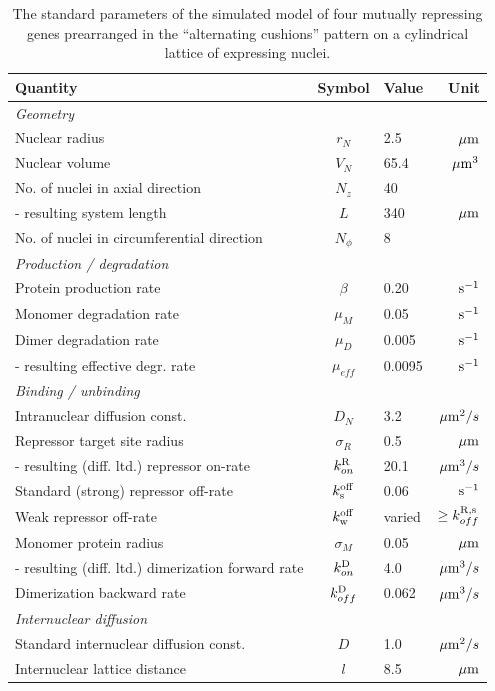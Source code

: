 \documentclass[10pt]{article}
\newcommand{\kRon}{k^{\rm R}_{on}}
\newcommand{\kRoffS}{k^{\rm off}_{\rm s}}
\newcommand{\kRoffW}{k^{\rm off}_{\rm w}}
\newcommand{\kDon}{k^{\rm D}_{on}}
\newcommand{\kDoff}{k^{\rm D}_{off}}
\newcommand{\unit}[1]{{\rm #1}}
\newcommand{\mum}{\unit{\mu m}}
\begin{document}
\newpage
\captionsetup[table]{width=.6\textwidth}
\mbox{} \vfill
\begin{table}[H]
 \centering
 \begin{tabular}{|l|c|lr|}
  \hline
  Quantity & Symbol & Value & Unit\\
  \hline
  \textit{Geometry} &&&\\
  Nuclear radius		& $r_N$		& 2.5	& $\mum$ \\
  Nuclear volume		& $V_N$		& 65.4	& $\mum^3$ \\
  No. of nuclei in axial direction		& $N_z$		& 40	& \\
  - resulting system length			& $L$		& 340	& $\mum$ \\
  No. of nuclei in circumferential direction	& $N_\phi$	& 8	& \\  
  \hline
  \textit{Production / degradation} &&&\\
  Protein production rate	& $\beta$	& 0.20 	& $\unit{s^{-1}}$ \\
  Monomer degradation rate	& $\mu_M$	& 0.05 	& $\unit{s^{-1}}$ \\
  Dimer degradation rate	& $\mu_D$	& 0.005 & $\unit{s^{-1}}$ \\
  - resulting effective degr. rate & $\mu_{eff}$	& 0.0095 & $\unit{s^{-1}}$ \\
  \hline
  \textit{Binding / unbinding} &&&\\
  Intranuclear diffusion const. & $D_N$		& 3.2	& $\mum^2/s$\\
  Repressor target site radius	& $\sigma_R$	& 0.5	& $\mum$ \\    
  - resulting (diff. ltd.) repressor on-rate 	& $\kRon$	& 20.1	& $\mum^3/s$ \\
  Standard (strong) repressor off-rate		& $\kRoffS$	& 0.06 	& $\unit{s^{-1}}$ \\
  Weak repressor off-rate			& $\kRoffW$	& varied & $\geq k^{\rm R,s}_{off}$ \\
  Monomer protein radius			& $\sigma_M$	& 0.05  & $\mum$ \\
  - resulting (diff. ltd.) dimerization forward rate & $\kDon$	& 4.0	& $\mum^3/s$ \\
  Dimerization backward rate			& $\kDoff$	& 0.062	& $\mum^3/s$ \\
  \hline
  \textit{Internuclear diffusion} &&&\\
  Standard internuclear diffusion const.	& $D$	& 1.0	& $\mum^2/s$ \\
  Internuclear lattice distance			& $l$	& 8.5	& $\mum$ \\
  \hline
 \end{tabular}

 \caption{The standard parameters of the simulated model of four mutually repressing genes
  prearranged in the ``alternating cushions'' pattern on a cylindrical lattice of expressing
  nuclei.
  \label{Tab-GG-SI-Parameters}
}
\end{table}
\vfill \mbox{}
\captionsetup[table]{width=\textwidth}
\end{document}
